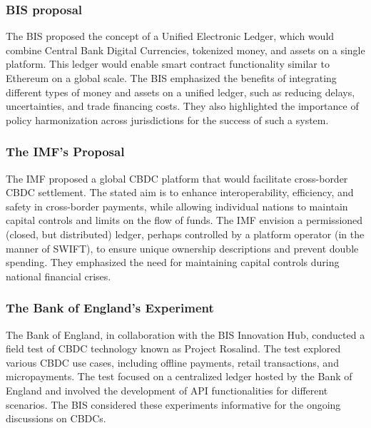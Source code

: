 \subsubsection{BIS proposal}
The BIS proposed the concept of a Unified Electronic Ledger, which would combine Central Bank Digital Currencies, tokenized money, and assets on a single platform. This ledger would enable smart contract functionality similar to Ethereum on a global scale. The BIS emphasized the benefits of integrating different types of money and assets on a unified ledger, such as reducing delays, uncertainties, and trade financing costs. They also highlighted the importance of policy harmonization across jurisdictions for the success of such a system.

\subsubsection{The IMF's Proposal}
The IMF proposed a global CBDC platform that would facilitate cross-border CBDC settlement. The stated aim is to enhance interoperability, efficiency, and safety in cross-border payments, while allowing individual nations to maintain capital controls and limits on the flow of funds. The IMF envision a permissioned (closed, but distributed) ledger, perhaps controlled by a platform operator (in the manner of SWIFT), to ensure unique ownership descriptions and prevent double spending. They emphasized the need for maintaining capital controls during national financial crises.

\subsubsection{The Bank of England's Experiment}
The Bank of England, in collaboration with the BIS Innovation Hub, conducted a field test of CBDC technology known as Project Rosalind. The test explored various CBDC use cases, including offline payments, retail transactions, and micropayments. The test focused on a centralized ledger hosted by the Bank of England and involved the development of API functionalities for different scenarios. The BIS considered these experiments informative for the ongoing discussions on CBDCs.


